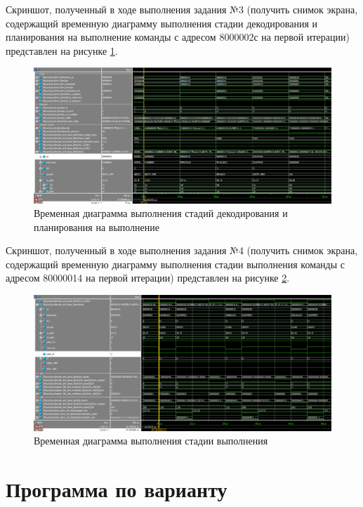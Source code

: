 Скриншот, полученный в ходе выполнения задания №3 (получить снимок экрана, содержащий временную диаграмму выполнения стадии декодирования и планирования на выполнение команды с адресом 8000002с на первой итерации) представлен на рисунке \ref{fig:task38000002c}.

\begin{figure}
	\centering
	\includegraphics[width=1\linewidth]{../images/task3_8000002c}
	\caption{Временная диаграмма выполнения стадий декодирования и планирования на выполнение}
	\label{fig:task38000002c}
\end{figure}

Скриншот, полученный в ходе выполнения задания №4 (получить снимок экрана, содержащий временную диаграмму выполнения стадии выполнения команды с адресом 80000014 на первой итерации) представлен на рисунке \ref{fig:task480000014}.

\begin{figure}
	\centering
	\includegraphics[width=1\linewidth]{../images/task4_80000014}
	\caption{Временная диаграмма выполнения стадии выполнения}
	\label{fig:task480000014}
\end{figure}

\section{Программа по варианту}


